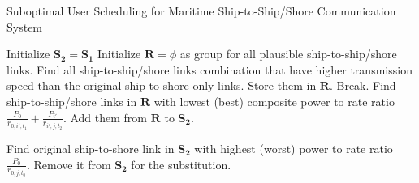 \documentclass[conference]{IEEEtran}
\begin{document}
 
 \begin{algorithm}[ht]
 \caption{Suboptimal User Scheduling for Maritime Ship-to-Ship/Shore Communication System}
 \label{alg:1}
 \begin{algorithmic}[1]
 \STATE Initialize ${{\mathbf{S}}_{\mathbf{2}}}={{\mathbf{S}}_{\mathbf{1}}}$
 \STATE Initialize ${\mathbf{R}} = \phi $ as group for all plausible ship-to-ship/shore links.
 \STATE Find all ship-to-ship/shore links combination that have higher transmission speed than the original ship-to-shore only links. Store them in ${\mathbf{R}}$.
    \STATE Break.
   \ENDIF
   \STATE Find ship-to-ship/shore links in ${\mathbf{R}}$ with lowest (best) composite power to rate ratio $ {\frac{{{P_0}}}{{{r_{0,i',{t_1}}}}} + \frac{{{P_{i'}}}}{{{r_{i',j,{t_2}}}}}} $. 
    \STATE Add them from ${\mathbf{R}}$ to ${{\mathbf{S}}_{\mathbf{2}}}$.
   \ENDIF
   \ENDWHILE
 \ENDFOR

   \STATE Find original ship-to-shore link in ${{\mathbf{S}}_{\mathbf{2}}}$ with highest (worst) power to rate ratio ${\frac{P_0}{r_{0,j,{t_0}}}}$. 
   \STATE Remove it from ${{\mathbf{S}}_{\mathbf{2}}}$ for the substitution.
   
 \ENDWHILE
 \end{algorithmic}
 \end{algorithm}
 
\end{document}
